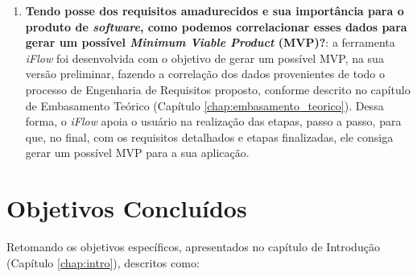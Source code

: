 \begin{enumerate}
    \item \textbf{Tendo posse dos requisitos amadurecidos e sua importância para o produto de \textit{software}, como podemos correlacionar esses dados para gerar um possível \textit{Minimum Viable Product} (MVP)?}: a ferramenta \textit{iFlow} foi desenvolvida com o objetivo de gerar um possível MVP, na sua versão preliminar, fazendo a correlação dos dados provenientes de todo o processo de Engenharia de Requisitos proposto, conforme descrito no capítulo de Embasamento Teórico (Capítulo \ref{chap:embasamento_teorico}). Dessa forma, o \textit{iFlow} apoia o usuário na realização das etapas, passo a passo, para que, no final, com os requisitos detalhados e etapas finalizadas, ele consiga gerar um possível MVP para a sua aplicação.
\end{enumerate}

\section{Objetivos Concluídos}
\label{sec:objetivos_concluido}
Retomando os objetivos específicos, apresentados no capítulo de Introdução (Capítulo \ref{chap:intro}), descritos como:

